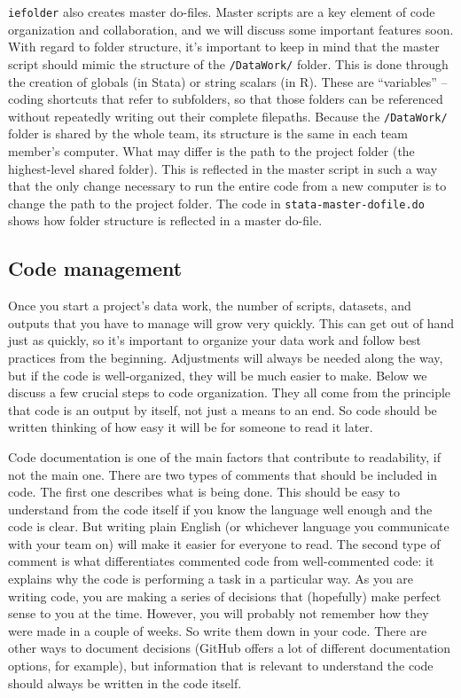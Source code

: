 \texttt{iefolder} also creates master do-files.
Master scripts are a key element of code organization and collaboration,
and we will discuss some important features soon.
With regard to folder structure, it's important to keep in mind
that the master script should mimic the structure of the \texttt{/DataWork/} folder.
This is done through the creation of globals (in Stata) or string scalars (in R).
These are ``variables'' -- coding shortcuts that refer to subfolders,
so that those folders can be referenced without repeatedly writing out their complete filepaths.
Because the \texttt{/DataWork/} folder is shared by the whole team,
its structure is the same in each team member's computer.
What may differ is the path to the project folder (the highest-level shared folder).
This is reflected in the master script in such a way that
the only change necessary to run the entire code from a new computer
is to change the path to the project folder.
The code in \texttt{stata-master-dofile.do} shows how folder structure is reflected in a master do-file.



\subsection{Code management}

Once you start a project's data work,
the number of scripts, datasets, and outputs that you have to manage will grow very quickly.
This can get out of hand just as quickly,
so it's important to organize your data work and follow best practices from the beginning.
Adjustments will always be needed along the way,
but if the code is well-organized, they will be much easier to make.
Below we discuss a few crucial steps to code organization.
They all come from the principle that code is an output by itself,
not just a means to an end.
So code should be written thinking of how easy it will be for someone to read it later.

Code documentation is one of the main factors that contribute to readability,
if not the main one.
There are two types of comments that should be included in code.
The first one describes what is being done.
This should be easy to understand from the code itself if you know the language well enough and the code is clear.
But writing plain English (or whichever language you communicate with your team on)
will make it easier for everyone to read.
The second type of comment is what differentiates commented code from well-commented code:
it explains why the code is performing a task in a particular way.
As you are writing code, you are making a series of decisions that
(hopefully) make perfect sense to you at the time.
However, you will probably not remember how they were made in a couple of weeks.
So write them down in your code.
There are other ways to document decisions
(GitHub offers a lot of different documentation options, for example),
but information that is relevant to understand the code should always be written in the code itself.

